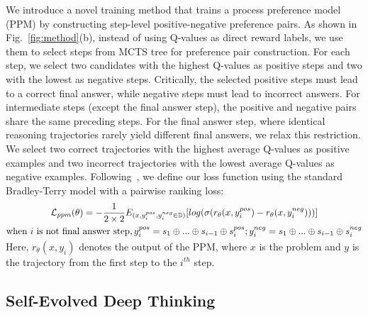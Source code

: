 We introduce a novel training method that trains a process preference model (PPM) by constructing step-level positive-negative preference pairs.  As shown in Fig.~\ref{fig:method}(b), instead of using Q-values as direct reward labels,  we use them to select steps from MCTS tree for preference pair construction.  For each step, we select two candidates with the highest Q-values as positive steps and two with the lowest as negative steps. Critically, the selected positive steps must lead to a correct final answer, while negative steps must lead to incorrect answers. For intermediate steps (except the final answer step), the  positive and negative pairs  share the same preceding steps. For the final answer step, where identical reasoning trajectories rarely yield different final answers, we relax this restriction. 
 We select two correct trajectories with the highest average  Q-values as positive examples and two incorrect trajectories with the lowest average Q-values as negative examples. Following~\citep{instructgpt}, we define our loss function using the standard Bradley-Terry model with a pairwise ranking loss: 
\vspace{-1ex}
 \begin{gather}
 	\label{eq:ppm}
 	\mathcal{L}_{ppm}(\theta)=-\frac{1}{2\times2}E_{(x,y_{i}^{pos}, y_{i}^{neg}\in \mathbb{D})}[log(\sigma(r_{\theta}(x,y_{i}^{pos})-r_{\theta}(x,y_{i}^{neg})))] \\
 	 \text{when $i$ is not final answer step},  y_{i}^{pos}=s_1\oplus...\oplus s_{i-1}\oplus s_{i}^{pos}; y_{i}^{neg}=s_1\oplus...\oplus s_{i-1}\oplus s_{i}^{neg}
 	   \vspace{-1ex}
 \end{gather}
Here, $r_{\theta}(x,y_i)$ denotes the output of the PPM, where $x$ is the problem and $y$  is the trajectory from the first step to the $i^{th}$ step.





\subsection{Self-Evolved Deep Thinking} 
\label{sec:selfevolution}
